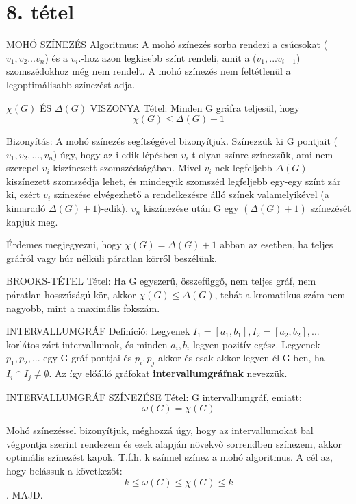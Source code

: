 \section{8. tétel}

\begin{tetel}{
MOHÓ SZÍNEZÉS Algoritmus}: A mohó színezés sorba rendezi a csúcsokat ($v_1, v_2...v_n$) és a $v_i.$-hoz azon legkisebb színt rendeli, amit a ($v_1,...v_{i-1}$) szomszédokhoz még nem rendelt. A mohó színezés nem feltétlenül a legoptimálisabb színezést adja.
\end{tetel}
\begin{tetel}{
$\chi(G)$ ÉS $\Delta(G)$ VISZONYA Tétel}: Minden	G gráfra teljesül, hogy
$$\chi(G) \leq \Delta(G)+1$$
\end{tetel}
\begin{leftbar}
Bizonyítás: A mohó színezés segítségével bizonyítjuk. Színezzük ki G pontjait ($v_1, v_2,..., v_n$) úgy, hogy az i-edik lépésben $v_i$-t olyan színre színezzük, ami nem szerepel $v_i$ kiszínezett szomszédságában. Mivel $v_i$-nek legfeljebb $\Delta(G)$ kiszínezett szomszédja lehet, és mindegyik szomszéd legfeljebb egy-egy színt zár ki, ezért $v_i$ színezése elvégezhető a rendelkezésre álló színek valamelyikével (a kimaradó $\Delta(G)+1)$-edik). $v_n$ kiszínezése után G egy $(\Delta(G)+1)$ színezését kapjuk meg.
\end{leftbar}
Érdemes megjegyezni, hogy $\chi(G) = \Delta(G)+1$ abban az esetben, ha teljes gráfról vagy húr nélküli páratlan körről beszélünk.
\begin{tetel}{
BROOKS-TÉTEL Tétel}: Ha G egyszerű, összefüggő, nem teljes gráf, nem páratlan hosszúságú kör, akkor $\chi(G) \leq \Delta(G)$, tehát a kromatikus szám nem nagyobb, mint a maximális fokszám.
\end{tetel}
\begin{definicio}{
INTERVALLUMGRÁF Definíció}: Legyenek $I_1 = [a_1, b_1], I_2 = [a_2, b_2],...$ korlátos zárt intervallumok, és minden $a_i, b_i$ legyen pozitív egész. Legyenek $p_1, p_2,...$ egy G gráf pontjai és ${p_i, p_j}$ akkor és csak akkor legyen él G-ben, ha $I_i\cap I_j \not= \emptyset$. Az így előálló gráfokat \textbf{intervallumgráfnak} nevezzük.
\end{definicio}
\begin{tetel}{
INTERVALLUMGRÁF SZÍNEZÉSE Tétel}: G intervallumgráf, emiatt:
$$\omega(G) = \chi(G)$$
\end{tetel}
\begin{leftbar}
Mohó színezéssel bizonyítjuk, méghozzá úgy, hogy az intervallumokat bal végpontja szerint rendezem és ezek alapján növekvő sorrendben színezem, akkor optimális színezést kapok. T.f.h. k színnel színez a mohó algoritmus. A cél az, hogy belássuk a következőt:
$$k \leq \omega(G) \leq \chi(G) \leq k$$. MAJD.
\end{leftbar}
